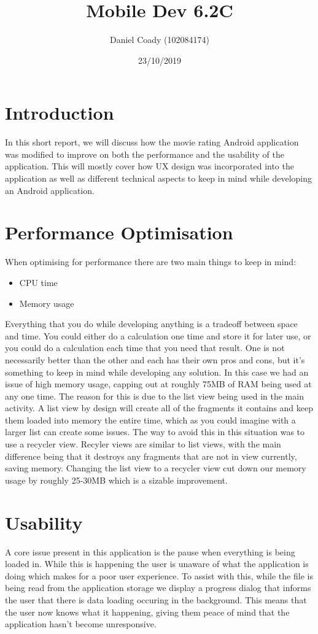 \documentclass{scrartcl}
\title{Mobile Dev 6.2C}
\author{Daniel Coady (102084174)}
\date{23/10/2019}
\begin{document}
\maketitle

\section*{Introduction}
In this short report, we will discuss how the movie rating Android
application was modified to improve on both the performance and the
usability of the application. This will mostly cover how UX design was
incorporated into the application as well as different technical aspects
to keep in mind while developing an Android application.

\section*{Performance Optimisation}
When optimising for performance there are two main things to keep in mind:
\begin{itemize}
    \item CPU time
    \item Memory usage
\end{itemize}
Everything that you do while developing anything is a tradeoff between
space and time. You could either do a calculation one time and store it
for later use, or you could do a calculation each time that you need
that result. One is not necessarily better than the other and each has
their own pros and cons, but it's something to keep in mind while developing
any solution. In this case we had an issue of high memory usage, capping
out at roughly 75MB of RAM being used at any one time. The reason for this
is due to the list view being used in the main activity. A list view by
design will create all of the fragments it contains and keep them loaded
into memory the entire time, which as you could imagine with a larger
list can create some issues. The way to avoid this in this situation was
to use a recycler view. Recyler views are similar to list views, with
the main difference being that it destroys any fragments that are not in
view currently, saving memory. Changing the list view to a recycler view
cut down our memory usage by roughly 25-30MB which is a sizable improvement.

\pagebreak

\section*{Usability}
A core issue present in this application is the pause when everything is
being loaded in. While this is happening the user is unaware of what
the application is doing which makes for a poor user experience. To
assist with this, while the file is being read from the application
storage we display a progress dialog that informs the user that there
is data loading occuring in the background. This means that the user now
knows what it happening, giving them peace of mind that the application
hasn't become unresponsive.
\end{document}
